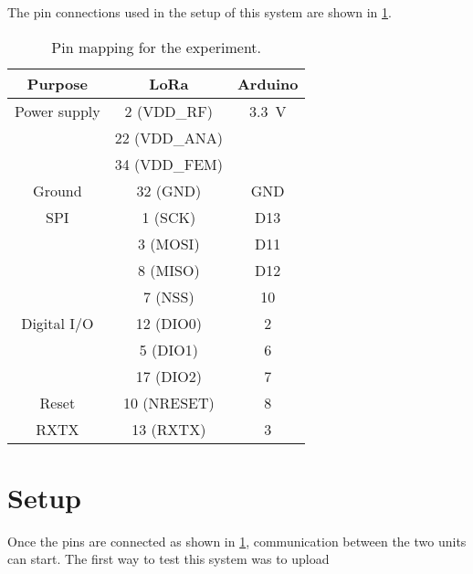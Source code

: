 \documentclass[11pt,onecolumn]{IEEEtran}
\begin{document}
The pin connections used in the setup of this system are shown in \cref{tab:pinmap}.
\begin{table}[ht]
  \centering
  \begin{tabular}{c | c | c}
    Purpose      & LoRa & Arduino \\ \hline
    Power supply & 2 (VDD\_RF)   & \SI{3.3}{\volt} \\
    & 22 (VDD\_ANA) & \\
    & 34 (VDD\_FEM) & \\ \hline
    Ground & 32 (GND) & GND \\ \hline
    SPI & 1 (SCK) & D13 \\
    & 3 (MOSI) & D11 \\
    & 8 (MISO) & D12 \\
    & 7 (NSS) & 10 \\ \hline
    Digital I/O & 12 (DIO0) & 2 \\
    & 5 (DIO1) & 6 \\
    & 17 (DIO2) & 7 \\ \hline
    Reset & 10 (NRESET) & 8 \\ \hline
    RXTX & 13 (RXTX) & 3
  \end{tabular}
  \caption{Pin mapping for the experiment.}
  \label{tab:pinmap}
\end{table}

\section{Setup}
\label{sec:setup}

Once the pins are connected as shown in \cref{tab:pinmap}, communication between the two units can start.
The first way to test this system was to upload
\end{document}
